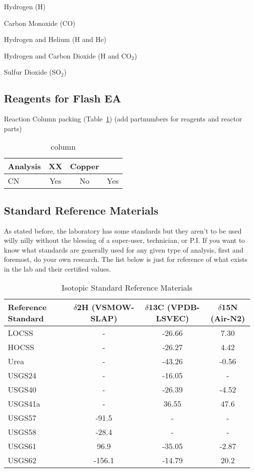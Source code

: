 \documentclass[12pt]{../SOP3_beta}\usepackage[]{graphicx}\usepackage[]{color}
\begin{document}
\NP Hydrogen (H)

\NP Carbon Monoxide (CO)

\NP Hydrogen and Helium (H and He)

\NP Hydrogen and Carbon Dioxide (H and CO$_2$)

\NP Sulfur Dioxide (SO$_2$)

\subsection{Reagents for Flash EA} \label{subsec:Reagents for Flash EA}

\NP Reaction Column packing (Table~\ref{column}) (add partnumbers for reagents and reactor parts)

\begin{table}[h]
\label{column}
\caption{column}
\centering
\begin{tabular}{lccc} \hline
Analysis      & XX    & Copper  & \\ \hline\hline
CN            & Yes   & No      & Yes \\ \hline


\end{tabular}
\end{table}

\subsection{Standard Reference Materials} \label{subsec:Standard Reference Materials}

\NP As stated before, the laboratory has some standards but they aren't to be used willy nilly without the blessing of a super-user, technician, or P.I. If you want to know what standards are generally used for any given type of analysis, first and foremost, do your own research. The list below is just for reference of what exists in the lab and their certified values.

\begin{table}[h]
\label{Isotopic Standard Reference Materials}
\caption{Isotopic Standard Reference Materials}
\centering
\begin{tabular}{lccc} \hline
Reference Standard  &$\delta$2H \tiny(VSMOW-SLAP) &$\delta$13C (VPDB-LSVEC)  &$\delta$15N (Air-N2) \\ \hline\hline
LOCSS &-  &-26.66  &7.30 \\
HOCSS &-  &-26.27  &4.42 \\
Urea &- &-43.26  &-0.56\\
USGS24 &- &-16.05  &- \\
USGS40 &- &-26.39  &-4.52 \\
USGS41a &-  &36.55 &47.6\\
USGS57 &-91.5 &-  &-\\
USGS58 &-28.4  &-  &-\\
USGS61 &96.9  &-35.05 &-2.87\\
USGS62 &-156.1  &-14.79 &20.2\\

\end{tabular}
\end{table}
\end{document}
